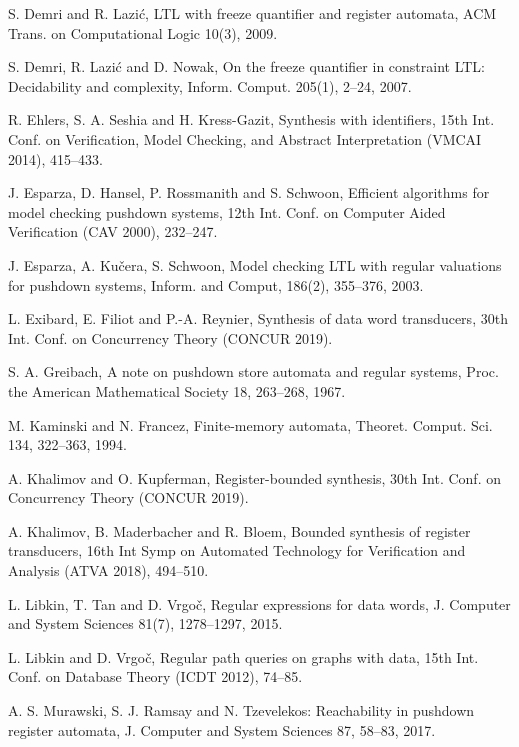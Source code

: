 \begin{thebibliography}{99}
S. Demri and R. Lazi\'{c},
LTL with freeze quantifier and register automata,
ACM Trans. on Computational Logic 10(3), 2009.

S. Demri, R. Lazi\'{c} and D. Nowak,
On the freeze quantifier in constraint LTL: Decidability and complexity,
Inform. Comput. 205(1), 2--24, 2007.

 R. Ehlers, S. A. Seshia and H. Kress-Gazit, Synthesis with identifiers,
15th Int. Conf. on Verification, Model Checking, and Abstract Interpretation (VMCAI 2014), 415--433.

J. Esparza, D. Hansel, P. Rossmanith and S. Schwoon,
Efficient algorithms for model checking pushdown systems,
12th Int. Conf. on Computer Aided Verification (CAV 2000), 232--247. %

J. Esparza, A. Ku\v{c}era, S. Schwoon,
Model checking LTL with regular valuations for pushdown systems,
Inform. and Comput, 186(2), 355--376, 2003.

 L. Exibard, E. Filiot and P.-A. Reynier, Synthesis of data word transducers,
30th Int. Conf. on Concurrency Theory (CONCUR 2019).

S. A. Greibach,
A note on pushdown store automata and regular systems,
Proc. the American Mathematical Society 18, 263--268, 1967.

M. Kaminski and N. Francez,
Finite-memory automata,
Theoret. Comput. Sci. 134, 322--363, 1994.

 A. Khalimov and O. Kupferman, Register-bounded synthesis,
30th Int. Conf. on Concurrency Theory (CONCUR 2019).

 A. Khalimov, B. Maderbacher and R. Bloem, Bounded synthesis of register transducers,
16th Int Symp on Automated Technology for Verification and Analysis (ATVA 2018), 494--510.

L. Libkin, T. Tan and D. Vrgo\v{c},
Regular expressions for data words,
J. Computer and System Sciences 81(7), 1278--1297, 2015.

L. Libkin and D. Vrgo\v{c},
Regular path queries on graphs with data,
15th Int. Conf. on Database Theory (ICDT 2012), 74--85.

A. S. Murawski, S. J. Ramsay and N. Tzevelekos:
Reachability in pushdown register automata,
J. Computer and System Sciences 87, 58--83, 2017.


\end{thebibliography}
